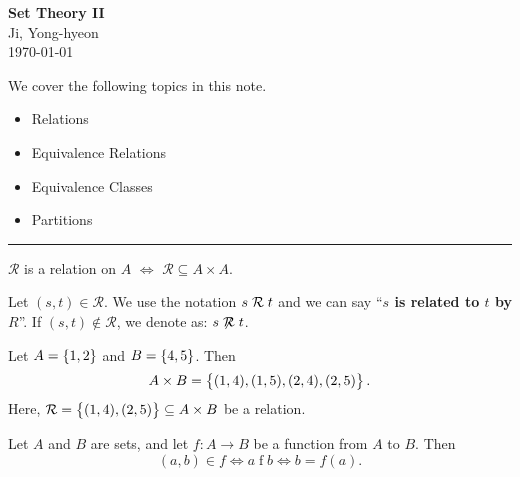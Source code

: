 \documentclass[11pt,openany]{article}
\begin{document}
\begin{center}
	\huge\textbf{Set Theory II}\\
	\vspace{0.5em}
	\large{Ji, Yong-hyeon}\\
	\vspace{0.5em}
	\normalsize{\today}\\
\end{center}

\noindent We cover the following topics in this note.
\begin{itemize}
	\item Relations
	\item Equivalence Relations
	\item Equivalence Classes
	\item Partitions
\end{itemize}
\hrule\vspace{12pt}
\begin{remark*}
	$\mathcal{R}$ is a relation on $A$ $\iff$ $\mathcal{R}\subseteq A\times A$.
\end{remark*}
\begin{note}[Notation]
	Let $(s,t)\in\mathcal{R}$. We use the notation $s\mathrel{\mathcal{R}} t$ and we can say ``\textbf{$s$ is related to $t$ by $R$}''. If $(s,t)\notin\mathcal{R}$, we denote as: $s\centernot\relation t$.
\end{note}
\vfill
\begin{example*}
	Let $A=\set{1,2}$ and $B=\set{4,5}$. Then \[
	A\times B=\set{(1,4),(1,5),(2,4),(2,5)}.
	\] Here, $\mathcal{R}=\set{(1,4),(2,5)}\subseteq A\times B$ be a relation.
	\begin{center}
		
	\end{center}
\end{example*}

\begin{example*}
	Let $A$ and $B$ are sets, and let $f:A\to B$ be a function from $A$ to $B$. Then \[
	(a,b)\in f\iff a\mathrel{f}b\iff b=f(a).
	\]
\end{example*}
\end{document}
